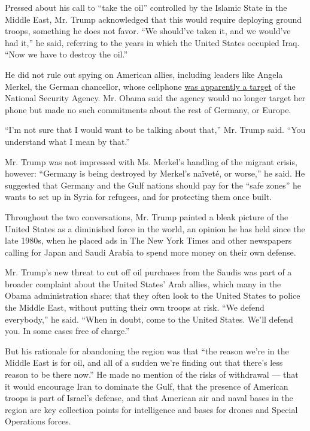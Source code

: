 Pressed about his call to ``take the oil'' controlled by the Islamic
State in the Middle East, Mr. Trump acknowledged that this would require
deploying ground troops, something he does not favor. ``We should've
taken it, and we would've had it,'' he said, referring to the years in
which the United States occupied Iraq. ``Now we have to destroy the
oil.''

He did not rule out spying on American allies, including leaders like
Angela Merkel, the German chancellor, whose cellphone
\href{http://www.nytimes.com/2013/10/25/world/europe/allegation-of-us-spying-on-merkel-puts-obama-at-crossroads.html}{was
apparently a target} of the National Security Agency. Mr. Obama said the
agency would no longer target her phone but made no such commitments
about the rest of Germany, or Europe.

``I'm not sure that I would want to be talking about that,'' Mr. Trump
said. ``You understand what I mean by that.''

Mr. Trump was not impressed with Ms. Merkel's handling of the migrant
crisis, however: ``Germany is being destroyed by Merkel's naïveté, or
worse,'' he said. He suggested that Germany and the Gulf nations should
pay for the ``safe zones'' he wants to set up in Syria for refugees, and
for protecting them once built.

Throughout the two conversations, Mr. Trump painted a bleak picture of
the United States as a diminished force in the world, an opinion he has
held since the late 1980s, when he placed ads in The New York Times and
other newspapers calling for Japan and Saudi Arabia to spend more money
on their own defense.

Mr. Trump's new threat to cut off oil purchases from the Saudis was part
of a broader complaint about the United States' Arab allies, which many
in the Obama administration share: that they often look to the United
States to police the Middle East, without putting their own troops at
risk. ``We defend everybody,'' he said. ``When in doubt, come to the
United States. We'll defend you. In some cases free of charge.''

But his rationale for abandoning the region was that ``the reason we're
in the Middle East is for oil, and all of a sudden we're finding out
that there's less reason to be there now.'' He made no mention of the
risks of withdrawal --- that it would encourage Iran to dominate the
Gulf, that the presence of American troops is part of Israel's defense,
and that American air and naval bases in the region are key collection
points for intelligence and bases for drones and Special Operations
forces.

